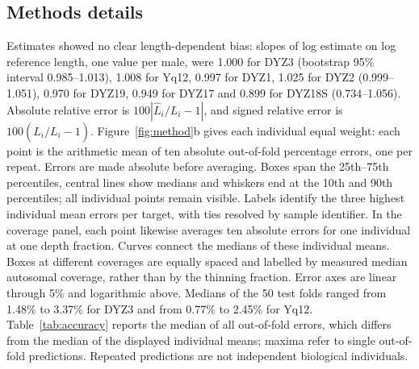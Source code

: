 \subsection{Methods details}\label{sec:n-methods}

Estimates showed no clear length-dependent bias: slopes of log estimate on log reference length, one value per male, were 1.000 for DYZ3 (bootstrap 95\% interval 0.985--1.013), 1.008 for Yq12, 0.997 for DYZ1, 1.025 for DYZ2 (0.999--1.051), 0.970 for DYZ19, 0.949 for DYZ17 and 0.899 for DYZ18S (0.734--1.056). Absolute relative error is $100|\widehat L_i/L_i-1|$, and signed relative error is $100(\widehat L_i/L_i-1)$. Figure~\ref{fig:method}b gives each individual equal weight: each point is the arithmetic mean of ten absolute out-of-fold percentage errors, one per repeat. Errors are made absolute before averaging. Boxes span the 25th--75th percentiles, central lines show medians and whiskers end at the 10th and 90th percentiles; all individual points remain visible. Labels identify the three highest individual mean errors per target, with ties resolved by sample identifier. In the coverage panel, each point likewise averages ten absolute errors for one individual at one depth fraction. Curves connect the medians of these individual means. Boxes at different coverages are equally spaced and labelled by measured median autosomal coverage, rather than by the thinning fraction. Error axes are linear through 5\% and logarithmic above. Medians of the 50 test folds ranged from 1.48\% to 3.37\% for DYZ3 and from 0.77\% to 2.45\% for Yq12. Table~\ref{tab:accuracy} reports the median of all out-of-fold errors, which differs from the median of the displayed individual means; maxima refer to single out-of-fold predictions. Repeated predictions are not independent biological individuals.

